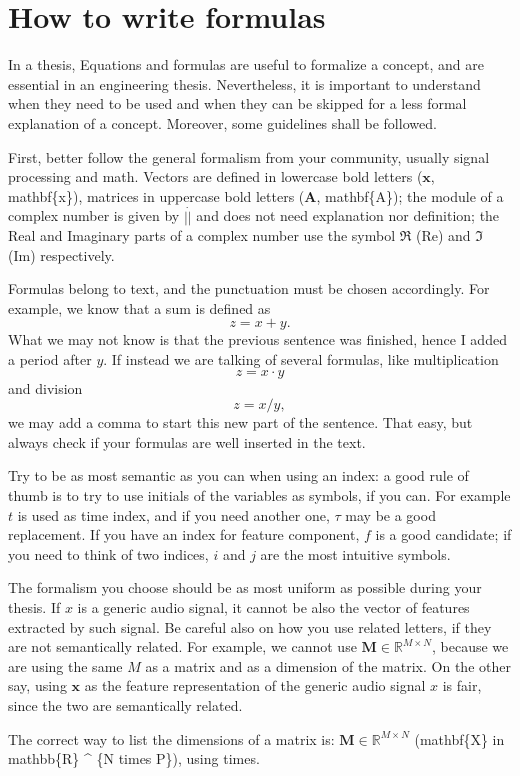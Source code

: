 \chapter{How to write formulas}

In a thesis, Equations and formulas are useful to formalize a concept, and are essential in an engineering thesis. Nevertheless, it is important to understand when they need to be used and when they can be skipped for a less formal explanation of a concept. Moreover, some guidelines shall be followed.

First, better follow the general formalism from your community, usually signal processing and math. Vectors are defined in lowercase bold letters ($\mathbf{x}$, {\bs}mathbf\{x\}), matrices in uppercase bold letters ($\mathbf{A}$, {\bs}mathbf\{A\}); the module of a complex number is given by $|\dot |$ and does not need explanation nor definition; the Real and Imaginary parts of a complex number use the symbol $\Re$ ({\bs}Re) and $\Im$ ({\bs}Im) respectively. 

Formulas belong to text, and the punctuation must be chosen accordingly. For example, we know that a sum is defined as 
$$
z=x+y.
$$
What we may not know is that the previous sentence was finished, hence I added a period after $y$. If instead we are talking of several formulas, like multiplication
$$
z=x \cdot y
$$
and division
$$
z=x/y,
$$
we may add a comma to start this new part of the sentence. That easy, but always check if your formulas are well inserted in the text.

Try to be as most semantic as you can when using an index: a good rule of thumb is to try to use initials of the variables as symbols, if you can. For example $t$ is used as time index, and if you need another one, $\tau$ may be a good replacement. If you have an index for feature component, $f$ is a good candidate; if you need to think of two indices, $i$ and $j$ are the most intuitive symbols.

The formalism you choose should be as most uniform as possible during your thesis. If $x$ is a generic audio signal, it cannot be also the vector of features extracted by such signal. Be careful also on how you use related letters, if they are not semantically related. For example, we cannot use $\mathbf{M} \in \mathbb{R}^{M \times N}$, because we are using the same $M$ as a matrix and as a dimension of the matrix. On the other say, using $\mathbf{x}$ as the feature representation of the generic audio signal $x$ is fair, since the two are semantically related.

The correct way to list the dimensions of a matrix is: $\mathbf{M} \in \mathbb{R}^{M \times N}$ ({\bs}mathbf\{X\} {\bs}in {\bs}mathbb\{R\} \^{}   \{N {\bs}times P\}), using {\bs}times.